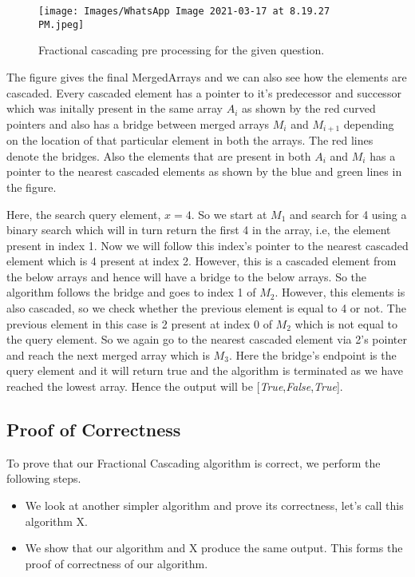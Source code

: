 \documentclass[11pt]{article}
\begin{document}
\begin{figure}[H]
    \centering
    \texttt{[image: Images/WhatsApp Image 2021-03-17 at 8.19.27 PM.jpeg]}
    \caption{Fractional cascading pre processing for the given question.}
    \label{fig:label}
\end{figure}
    


The figure gives the final MergedArrays and we can also see how the elements are cascaded. Every cascaded element has a pointer to it's predecessor and successor which was initally present in the same array $A_i$ as shown by the red curved pointers and also has a bridge between merged arrays $M_i$ and $M_{i+1}$ depending on the location of that particular element in both the arrays. The red lines denote the bridges. Also the elements that are present in both $A_i$ and $M_i$ has a pointer to the nearest cascaded elements as shown by the blue and green lines in the figure.


Here, the search query element, $x = 4$. So we start at $M_1$ and search for 4 using a binary search which will in turn return the first 4 in the array, i.e, the element present in index 1. Now we will follow this index's pointer to the nearest cascaded element which is 4 present at index 2. However, this is a cascaded element from the below arrays and hence will have a bridge to the below arrays. So the algorithm follows the bridge and goes to index 1 of $M_2$. However, this elements is also cascaded, so we check whether the previous element is equal to 4 or not. The previous element in this case is 2 present at index 0 of $M_2$ which is not equal to the query element. So we again go to the nearest cascaded element via 2's pointer and reach the next merged array which is $M_3$. Here the bridge's endpoint is the query element and it will return true and the algorithm is terminated as we have reached the lowest array. Hence the output will be [\textit{True},\textit{False},\textit{True}].


\subsection{Proof of Correctness}
To prove that our Fractional Cascading algorithm is correct, we perform the following steps.
\begin{itemize}
    \item We look at another simpler algorithm and prove its correctness, let's call this algorithm X.
    \item We show that our algorithm and X produce the same output. This forms the proof of correctness of our algorithm.
\end{itemize}
\end{document}
